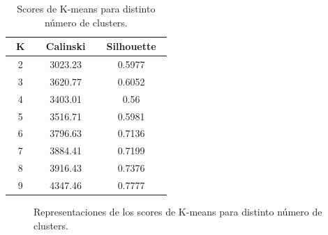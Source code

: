 \documentclass[oneside]{book}
\begin{document}
\begin{table}[H]
  \centering
\begin{tabular}{|c|cc|}
  \hline
  ~\hspace{2mm}K\hspace{2mm}~ & ~\hspace{2mm}Calinski\hspace{2mm}~ & ~\hspace{2mm}Silhouette\hspace{2mm}~ \\ \hline
2 & 3023.23 & 0.5977 \\ \hline
3 & 3620.77 & 0.6052 \\ \hline
4 & 3403.01 & 0.56 \\ \hline
5 & 3516.71 & 0.5981 \\ \hline
6 & 3796.63 & 0.7136 \\ \hline
7 & 3884.41 & 0.7199 \\ \hline
8 & 3916.43 & 0.7376 \\ \hline
9 & 4347.46 & 0.7777 \\ \hline
\end{tabular}
\caption{Scores de K-means para distinto número de clusters.}
\label{tab:k-means2}
\end{table}

\begin{figure}[H]
  \centering
  \caption{Representaciones de los scores de K-means para distinto número de clusters.}
  \label{fig:k-means2-scores}
\end{figure}
\end{document}
